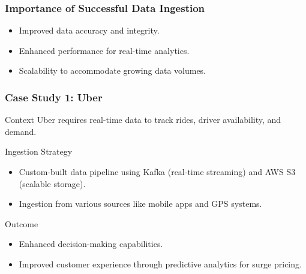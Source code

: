 \documentclass[aspectratio=169]{beamer}
\begin{document}
\begin{frame}[fragile]
    \frametitle{Importance of Successful Data Ingestion}
    \begin{itemize}
        \item Improved data accuracy and integrity.
        \item Enhanced performance for real-time analytics.
        \item Scalability to accommodate growing data volumes.
    \end{itemize}
\end{frame}

\begin{frame}[fragile]
    \frametitle{Case Study 1: Uber}
    \begin{block}{Context}
        Uber requires real-time data to track rides, driver availability, and demand.
    \end{block}
    \begin{block}{Ingestion Strategy}
        \begin{itemize}
            \item Custom-built data pipeline using Kafka (real-time streaming) and AWS S3 (scalable storage).
            \item Ingestion from various sources like mobile apps and GPS systems.
        \end{itemize}
    \end{block}
    \begin{block}{Outcome}
        \begin{itemize}
            \item Enhanced decision-making capabilities.
            \item Improved customer experience through predictive analytics for surge pricing.
        \end{itemize}
    \end{block}
\end{frame}
\end{document}
